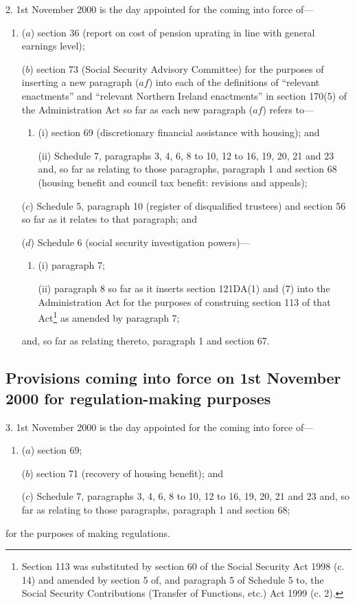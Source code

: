 \documentclass[12pt,a4paper]{article}
\begin{document}
2.  1st November 2000 is the day appointed for the coming into force of—
\begin{enumerate}\item[]
($a$) section 36 (report on cost of pension uprating in line with general earnings level);

($b$) section 73 (Social Security Advisory Committee) for the purposes of inserting a new paragraph ($af$)  into each of the definitions of “relevant enactments” and “relevant Northern Ireland enactments” in section 170(5) of the Administration Act so far as each new paragraph ($af$)  refers to—
\begin{enumerate}\item[]
(i) section 69 (discretionary financial assistance with housing); and

(ii) Schedule 7, paragraphs 3, 4, 6, 8 to 10, 12 to 16, 19, 20, 21 and 23 and, so far as relating to those paragraphs, paragraph 1 and section 68 (housing benefit and council tax benefit: revisions and appeals);
\end{enumerate}

($c$) Schedule 5, paragraph 10 (register of disqualified trustees) and section 56 so far as it relates to that paragraph; and

($d$) Schedule 6 (social security investigation powers)—
\begin{enumerate}\item[]
(i) paragraph 7;

(ii) paragraph 8 so far as it inserts section 121DA(1) and (7) into the Administration Act for the purposes of construing section 113 of that Act\footnote{\frenchspacing Section 113 was substituted by section 60 of the Social Security Act 1998 (c. 14) and amended by section 5 of, and paragraph 5 of Schedule 5 to, the Social Security Contributions (Transfer of Functions, etc.) Act 1999 (c. 2).} as amended by paragraph 7;
\end{enumerate}
and, so far as relating thereto, paragraph 1 and section 67.
\end{enumerate}

\subsection[3. Provisions coming into force on 1st November 2000 for regulation-making purposes]{Provisions coming into force on 1st November 2000 for regulation\hspace{0pt}-making purposes}

3.  1st November 2000 is the day appointed for the coming into force of—
\begin{enumerate}\item[]
($a$) section 69;

($b$) section 71 (recovery of housing benefit); and

($c$) Schedule 7, paragraphs 3, 4, 6, 8 to 10, 12 to 16, 19, 20, 21 and 23 and, so far as relating to those paragraphs, paragraph 1 and section 68;
\end{enumerate}
for the purposes of making regulations.
\end{document}
